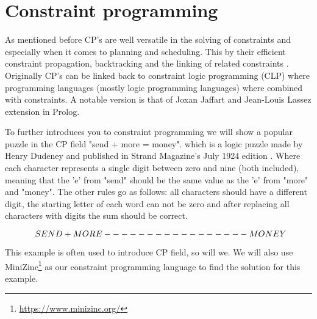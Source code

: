 \section{Constraint programming}
\label{CS:CP}
As mentioned before CP's are well versatile in the solving of constraints and especially when it comes to planning and scheduling. This by their efficient constraint propagation, backtracking and the linking of related constraints \cite{66WikiCP}. Originally CP's can be linked back to constraint logic programming (CLP) where programming languages (mostly logic programming languages) where combined with constraints. A notable version is that of Joxan Jaffart and Jean-Louis Lassez \cite{65jaffar1987constraint, 66WikiCP} extension in Prolog.

To further introduces you to constraint programming we will show a popular puzzle in the CP field "send + more = money". which is a logic puzzle made by Henry Dudeney and published in Strand Magazine's July 1924 edition \cite{sendMoreMoney}.
Where each character represents a single digit between zero and nine (both included), meaning that the 'e' from "send" should be the same value as the 'e' from "more" and "money". The other rules go as follows: all characters should have a different digit, the starting letter of each word can not be zero and after replacing all characters with digits the sum should be correct. 
\begin{center}
	\[$$
	\; \; S E N D\\
	+ M O R E\\
	-----------------\\
	M O N E Y
	$$\]
\end{center}
This example is often used to introduce CP field, so will we. We will also use MiniZinc\footnote{\url{https://www.minizinc.org/}} as our constraint programming language to find the solution for this example.

